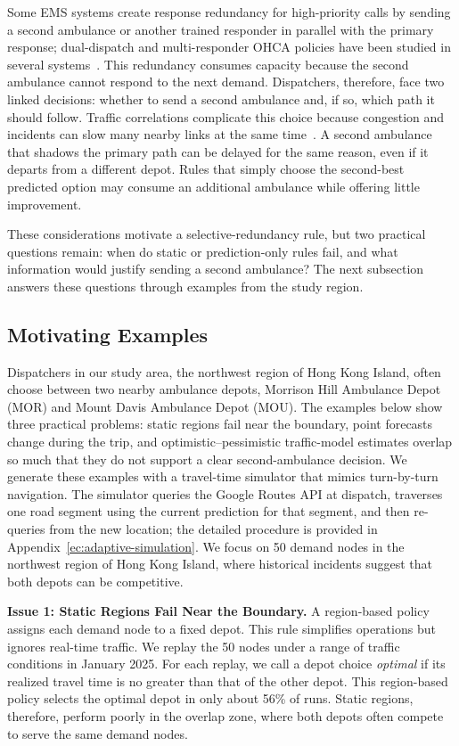 \documentclass[11pt, letterpaper, oneside, reqno]{amsart}
\begin{document}
Some EMS systems create response redundancy for high-priority calls by sending a second ambulance or another trained responder in parallel with the primary response; dual-dispatch and multi-responder OHCA policies have been studied in several systems~\cite{ref:hollenberg2009dual, ref:kim2019application, ref:strnad2022impact}.
This redundancy consumes capacity because the second ambulance cannot respond to the next demand. Dispatchers, therefore, face two linked decisions: whether to send a second ambulance and, if so, which path it should follow.
Traffic correlations complicate this choice because congestion and incidents can slow many nearby links at the same time~\cite{ref:zhang2017lagrangian, ref:srinivasan2014reliable}. A second ambulance that shadows the primary path can be delayed for the same reason, even if it departs from a different depot. Rules that simply choose the second-best predicted option may consume an additional ambulance while offering little improvement.

These considerations motivate a selective-redundancy rule, but two practical questions remain: when do static or prediction-only rules fail, and what information would justify sending a second ambulance? The next subsection answers these questions through examples from the study region.


\subsection{Motivating Examples}\label{sec:examples}
Dispatchers in our study area, the northwest region of Hong Kong Island, often choose between two nearby ambulance depots, Morrison Hill Ambulance Depot (MOR) and Mount Davis Ambulance Depot (MOU). The examples below show three practical problems: static regions fail near the boundary, point forecasts change during the trip, and optimistic--pessimistic traffic-model estimates overlap so much that they do not support a clear second-ambulance decision. We generate these examples with a travel-time simulator that mimics turn-by-turn navigation. The simulator queries the Google Routes API at dispatch, traverses one road segment using the current prediction for that segment, and then re-queries from the new location; the detailed procedure is provided in Appendix~\ref{ec:adaptive-simulation}. We focus on 50 demand nodes in the northwest region of Hong Kong Island, where historical incidents suggest that both depots can be competitive.

\textbf{Issue 1: Static Regions Fail Near the Boundary.} A region-based policy assigns each demand node to a fixed depot. This rule simplifies operations but ignores real-time traffic. We replay the 50 nodes under a range of traffic conditions in January 2025. For each replay, we call a depot choice \textit{optimal} if its realized travel time is no greater than that of the other depot. This region-based policy selects the optimal depot in only about 56\% of runs. Static regions, therefore, perform poorly in the overlap zone, where both depots often compete to serve the same demand nodes.
\end{document}
